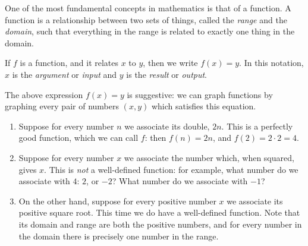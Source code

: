 



One of the most fundamental concepts in mathematics is that of a function. A function is a relationship between
two sets of things, called the \textit{range} and the \textit{domain}, such that everything in the range is
related to exactly one thing in the domain.

If $ f $ is a function, and it relates $ x $ to $ y $, then we write $ f(x) = y $. In this notation, $ x $ is the \emph{argument} or \emph{input}
and $ y $ is the \emph{result} or \emph{output}.

The above expression $ f(x) = y $ is suggestive: we can graph functions by graphing every pair of numbers $ (x,y) $
which satisfies this equation.

\begin{ex}\leavevmode
  \begin{enumerate}
    \item Suppose for every number $ n $ we associate its double, $ 2n $. This is a perfectly good function,
          which we can call $ f $: then $ f(n) = 2n $, and $ f(2) = 2 \cdot 2 = 4 $.
          \begin{center}
          \end{center}
    \item Suppose for every number $ x $ we associate the number which, when squared, gives $ x $. This is \emph{not}
          a well-defined function: for example, what number do we associate with $4$: $2$, or $ - 2 $? What number
          do we associate with $ -1 $?
    \item On the other hand, suppose for every positive number $ x $ we associate its positive square root. This time
          we do have a well-defined function. Note that its domain and range are both the positive numbers, and for every
          number in the domain there is precisely one number in the range.
          \begin{center}
            \fbox{\begin{tikzpicture}

\end{tikzpicture}}
\end{center}
\end{enumerate}
\end{ex}
